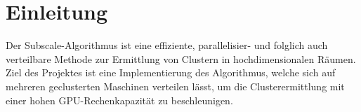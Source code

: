 \section{Einleitung}
Der Subscale-Algorithmus ist eine effiziente, parallelisier- und folglich auch verteilbare Methode zur Ermittlung von Clustern in hochdimensionalen Räumen. Ziel des Projektes ist eine Implementierung des Algorithmus, welche sich auf mehreren geclusterten Maschinen verteilen lässt, um die Clusterermittlung mit einer hohen GPU-Rechenkapazität zu beschleunigen.